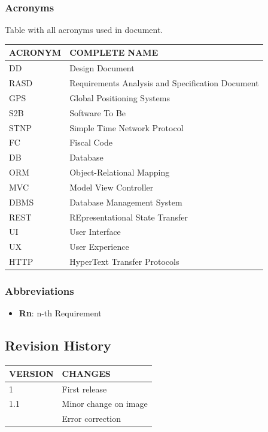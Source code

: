 \documentclass{article}
\begin{document}
\subsubsection{Acronyms}
Table with all acronyms used in document.
\begin{center}
\begin{tabular}{ | l | l |}
    \hline
    ACRONYM & COMPLETE NAME \\
    \hline
    DD & Design Document \\
    \hline
    RASD & Requirements Analysis and Specification Document \\
    \hline
    GPS & Global Positioning Systems \\
    \hline
    S2B & Software To Be \\
    \hline
    STNP & Simple Time Network Protocol \\
    \hline 
    FC & Fiscal Code \\
    \hline
    DB & Database \\
    \hline
    ORM & Object-Relational Mapping \\
    \hline
    MVC & Model View Controller \\
    \hline
    DBMS & Database Management System \\
    \hline
    REST & REpresentational State Transfer \\
    \hline
    UI & User Interface \\
    \hline
    UX & User Experience \\
    \hline
    HTTP & HyperText Transfer Protocols \\
    \hline
\end{tabular}
\end{center}

\subsubsection{Abbreviations}
\begin{itemize}
    \item \textbf{Rn}: n-th Requirement 
\end{itemize}

\subsection{Revision History}
\begin{center}
    \begin{tabular}{ | l | l |}
        \hline
        VERSION & CHANGES \\
        \hline
        1 & First release \\
        \hline
        1.1 & Minor change on image \\
            & Error correction \\
        \hline
    \end{tabular}
    \end{center}
\end{document}
